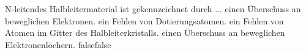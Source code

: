     {N-leitendes Halbleitermaterial ist gekennzeichnet durch ...}
    {einen Überschuss an beweglichen Elektronen.}
    {ein Fehlen von Dotierungsatomen.}
    {ein Fehlen von Atomen im Gitter des Halbleiterkristalls.}
    {einen Überschuss an beweglichen Elektronenlöchern.}
    {false}{false}